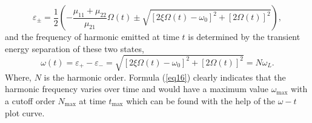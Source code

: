 \documentclass[10pt,letterpaper]{article}
\begin{document}
\begin{equation}
{\varepsilon _ \pm } = \frac{1}{2}\left( { - \frac{{{\mu _{11}} + {\mu _{22}}}}{{{\mu _{21}}}}\Omega \left( t \right) \pm \sqrt {{{\left[ {2\xi \Omega \left( t \right) - {\omega _0}} \right]}^2} + {{\left[ {2\Omega \left( t \right)} \right]}^2}} } \right),
\label{eq15}
\end{equation}
and the frequency of harmonic emitted at time $t$ is determined by the transient energy separation of these two states,
\begin{equation}
\omega(t)  = {\varepsilon _ + } - {\varepsilon _ - } = \sqrt {{{\left[ {2\xi \Omega \left( t \right) - {\omega _0}} \right]}^2} + {{\left[ {2\Omega \left( t \right)} \right]}^2}}  = N{\omega _L}.
\label{eq16}
\end{equation}
Where, $N$ is the harmonic order. Formula (\ref{eq16}) clearly indicates that the harmonic frequency varies over time and would have a maximum value $\omega_{\textrm{max}}$ with a cutoff order $N_{\textrm{max}}$ at time $t_{\textrm{max}}$ which can be found with the help of the $\omega-t$ plot curve.
\end{document}
